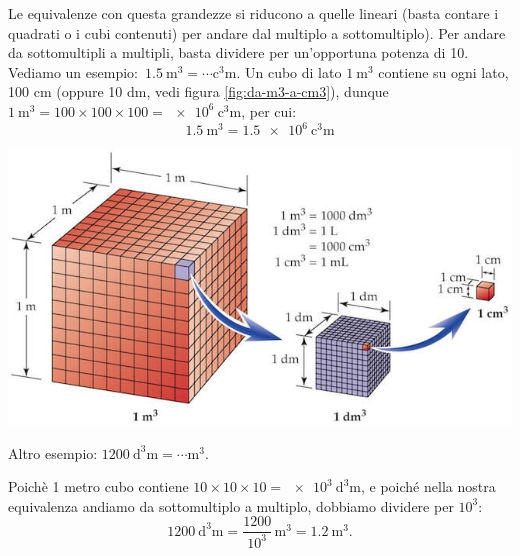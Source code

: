 \documentclass[12pt,a4paper,oneside]{book}
\theoremstyle{esercizio}
\begin{document}
Le  equivalenze con questa grandezze si riducono a quelle lineari (basta contare i quadrati o i cubi contenuti) per andare dal multiplo a sottomultiplo). Per andare da sottomultipli a  multipli, basta dividere per un'opportuna potenza di 10. Vediamo un esempio: \,$\SI{1,5}{\cubic\meter} = \cdots \si{\cubic\centi\meter}$. Un cubo di lato $\SI{1}{\cubic\meter}$ contiene su ogni lato, 100 cm (oppure 10 dm, vedi  figura \ref{fig:da-m3-a-cm3}), dunque $\SI{1}{\cubic\meter} = 100\times100\times100 = \SI{e+6}{\cubic\centi\meter}$, per cui:
\[
\SI{1,5}{\cubic\meter} = \SI{1,5e+6}{\cubic\centi\meter}
\]

\begin{minipage}{\linewidth}
	\centering
	\includegraphics[scale=0.5]{img/da-m3-a-cm3}
	\label{fig:da-m3-a-cm3}
\end{minipage}






Altro esempio: $\SI{1200}{\cubic\deci\meter} = \cdots \si{\cubic\meter}$.

Poichè 1 metro cubo contiene  $10\times10\times10 = \SI{e3}{\cubic\deci\meter}$,   e poiché   nella nostra equivalenza andiamo da sottomultiplo a multiplo, dobbiamo dividere per $10^3$:
\[
\SI{1200}{\cubic\deci\meter} = \frac{1200}{10^3}\,\si{\cubic\meter} = \SI{1,2}{\cubic\meter}.
\]
\end{document}
